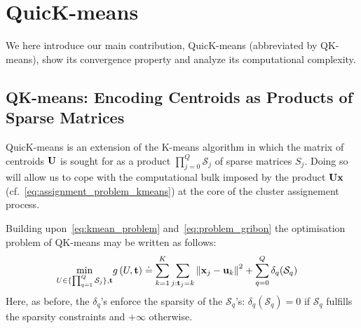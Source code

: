 
\section{QuicK-means}
\label{sec:contribution}

We here introduce our main contribution, QuicK-means (abbreviated by QK-means), 
show its convergence property and analyze its computational complexity.

\subsection{QK-means: Encoding Centroids as Products of Sparse Matrices}

QuicK-means is an extension of the K-means algorithm in which the matrix of centroids ${\mathbf{U}}$
is sought for as a product $\prod_{j=0}^Q\mathcal{S}_j$ of sparse matrices $S_j$.
Doing so will allow us to cope with the computational bulk imposed by the product ${\mathbf{U}}{\mathbf{x}}$
(cf.~\eqref{eq:assignment_problem_kmeans}) at the core of the cluster assignement process.

Building upon~\eqref{eq:kmean_problem} and~\eqref{eq:problem_gribon} the optimisation problem 
of QK-means may be written as follows:
%
\begin{align}
\label{eq:qmean_problem}
 \min_{U\in\{\prod_{q=1}^Q\mathcal{S}_j\}, {\mathbf{t}}} & g\left(U, {\mathbf{t}}\right)
    \doteq \sum_{k=1}^{K}\sum_{j: {\mathbf{t}}_j = k} \left\|{\mathbf{x}}_j -{\mathbf{u}}_k\right\|^2 + \sum_{q=0}^{Q} \delta_q(\mathcal{S}_q)
\end{align}
%
Here, 
as before, the $\delta_q$'s enforce the sparsity of the $\mathcal{S}_q$'s: $\delta_q(\mathcal{S}_q)=0$ if $\mathcal{S}_q$ fulfills the sparsity constraints
and $+\infty$ otherwise.


